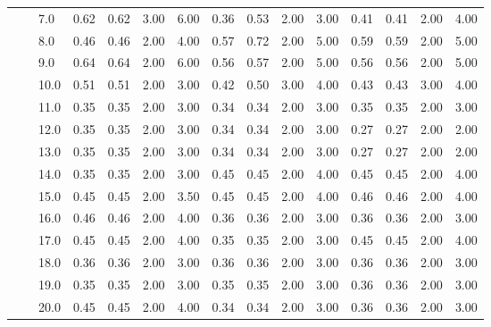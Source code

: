 \begin{tabular}{lllrrrrrrrrrrrr}
       &     & 7.0  &       0.62 &      0.62 & 3.00 &   6.00 &       0.36 &      0.53 & 2.00 &   3.00 &       0.41 &      0.41 & 2.00 &   4.00 \\
       &     & 8.0  &       0.46 &      0.46 & 2.00 &   4.00 &       0.57 &      0.72 & 2.00 &   5.00 &       0.59 &      0.59 & 2.00 &   5.00 \\
       &     & 9.0  &       0.64 &      0.64 & 2.00 &   6.00 &       0.56 &      0.57 & 2.00 &   5.00 &       0.56 &      0.56 & 2.00 &   5.00 \\
       &     & 10.0 &       0.51 &      0.51 & 2.00 &   3.00 &       0.42 &      0.50 & 3.00 &   4.00 &       0.43 &      0.43 & 3.00 &   4.00 \\
       &     & 11.0 &       0.35 &      0.35 & 2.00 &   3.00 &       0.34 &      0.34 & 2.00 &   3.00 &       0.35 &      0.35 & 2.00 &   3.00 \\
       &     & 12.0 &       0.35 &      0.35 & 2.00 &   3.00 &       0.34 &      0.34 & 2.00 &   3.00 &       0.27 &      0.27 & 2.00 &   2.00 \\
       &     & 13.0 &       0.35 &      0.35 & 2.00 &   3.00 &       0.34 &      0.34 & 2.00 &   3.00 &       0.27 &      0.27 & 2.00 &   2.00 \\
       &     & 14.0 &       0.35 &      0.35 & 2.00 &   3.00 &       0.45 &      0.45 & 2.00 &   4.00 &       0.45 &      0.45 & 2.00 &   4.00 \\
       &     & 15.0 &       0.45 &      0.45 & 2.00 &   3.50 &       0.45 &      0.45 & 2.00 &   4.00 &       0.46 &      0.46 & 2.00 &   4.00 \\
       &     & 16.0 &       0.46 &      0.46 & 2.00 &   4.00 &       0.36 &      0.36 & 2.00 &   3.00 &       0.36 &      0.36 & 2.00 &   3.00 \\
       &     & 17.0 &       0.45 &      0.45 & 2.00 &   4.00 &       0.35 &      0.35 & 2.00 &   3.00 &       0.45 &      0.45 & 2.00 &   4.00 \\
       &     & 18.0 &       0.36 &      0.36 & 2.00 &   3.00 &       0.36 &      0.36 & 2.00 &   3.00 &       0.36 &      0.36 & 2.00 &   3.00 \\
       &     & 19.0 &       0.35 &      0.35 & 2.00 &   3.00 &       0.35 &      0.35 & 2.00 &   3.00 &       0.36 &      0.36 & 2.00 &   3.00 \\
       &     & 20.0 &       0.45 &      0.45 & 2.00 &   4.00 &       0.34 &      0.34 & 2.00 &   3.00 &       0.36 &      0.36 & 2.00 &   3.00 \\

\end{tabular}

